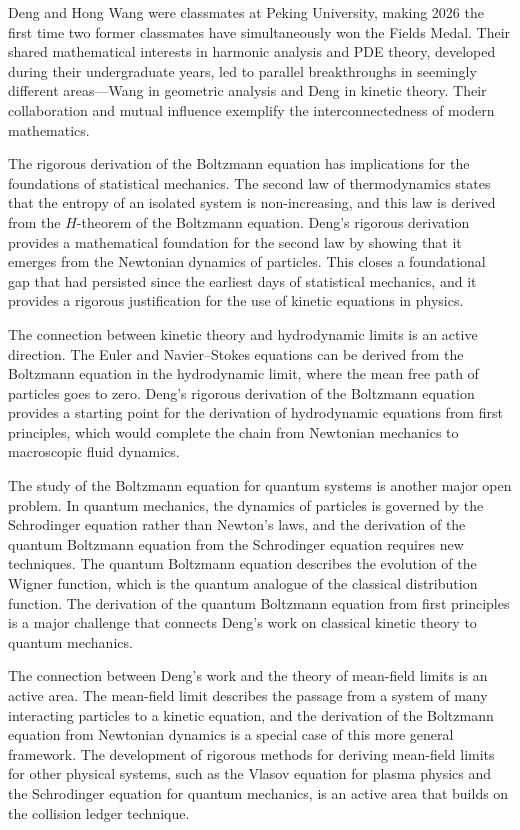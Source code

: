 Deng and Hong Wang were classmates at Peking University, making 2026 the first time two former classmates have simultaneously won the Fields Medal. Their shared mathematical interests in harmonic analysis and PDE theory, developed during their undergraduate years, led to parallel breakthroughs in seemingly different areas---Wang in geometric analysis and Deng in kinetic theory. Their collaboration and mutual influence exemplify the interconnectedness of modern mathematics.

The rigorous derivation of the Boltzmann equation has implications for the foundations of statistical mechanics. The second law of thermodynamics states that the entropy of an isolated system is non-increasing, and this law is derived from the $H$-theorem of the Boltzmann equation. Deng's rigorous derivation provides a mathematical foundation for the second law by showing that it emerges from the Newtonian dynamics of particles. This closes a foundational gap that had persisted since the earliest days of statistical mechanics, and it provides a rigorous justification for the use of kinetic equations in physics.

The connection between kinetic theory and hydrodynamic limits is an active direction. The Euler and Navier--Stokes equations can be derived from the Boltzmann equation in the hydrodynamic limit, where the mean free path of particles goes to zero. Deng's rigorous derivation of the Boltzmann equation provides a starting point for the derivation of hydrodynamic equations from first principles, which would complete the chain from Newtonian mechanics to macroscopic fluid dynamics.

The study of the Boltzmann equation for quantum systems is another major open problem. In quantum mechanics, the dynamics of particles is governed by the Schrodinger equation rather than Newton's laws, and the derivation of the quantum Boltzmann equation from the Schrodinger equation requires new techniques. The quantum Boltzmann equation describes the evolution of the Wigner function, which is the quantum analogue of the classical distribution function. The derivation of the quantum Boltzmann equation from first principles is a major challenge that connects Deng's work on classical kinetic theory to quantum mechanics.

The connection between Deng's work and the theory of mean-field limits is an active area. The mean-field limit describes the passage from a system of many interacting particles to a kinetic equation, and the derivation of the Boltzmann equation from Newtonian dynamics is a special case of this more general framework. The development of rigorous methods for deriving mean-field limits for other physical systems, such as the Vlasov equation for plasma physics and the Schrodinger equation for quantum mechanics, is an active area that builds on the collision ledger technique.


